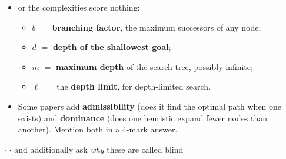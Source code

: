 {\begin{itemize}
  \item {} or the complexities score nothing:
  \begin{itemize}
    \item $b$ $=$ \textbf{branching factor}, the maximum successors of any node;
    \item $d$ $=$ \textbf{depth of the shallowest goal};
    \item $m$ $=$ \textbf{maximum depth} of the search tree, possibly infinite;
    \item $\ell$ $=$ the \textbf{depth limit}, for depth-limited search.
  \end{itemize}
  \item Some papers add \textbf{admissibility} (does it find the optimal path when one
        exists) and \textbf{dominance} (does one heuristic expand fewer nodes than
        another). Mention both in a 4-mark answer.
\end{itemize}}


{\color{sub}\footnotesize {}  \gap$\cdot$\gap
{} \gap$\cdot$\gap
{} and  additionally ask
\emph{why} these are called blind}

